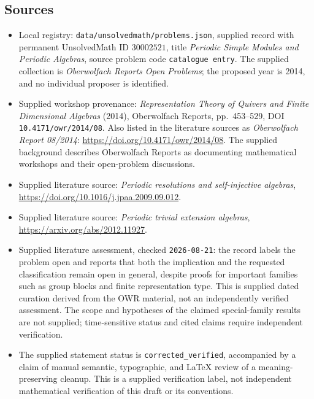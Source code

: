 \documentclass[11pt]{article}
\begin{document}
\subsection{Sources}
\begin{itemize}
\item Local registry: \texttt{data/unsolvedmath/problems.json}, supplied record with permanent UnsolvedMath ID \(30002521\), title \emph{Periodic Simple Modules and Periodic Algebras}, source problem code \texttt{catalogue entry}. The supplied collection is \emph{Oberwolfach Reports Open Problems}; the proposed year is 2014, and no individual proposer is identified.
\item Supplied workshop provenance: \emph{Representation Theory of Quivers and Finite Dimensional Algebras} (2014), Oberwolfach Reports, pp.\ 453--529, DOI \texttt{10.4171/owr/2014/08}. Also listed in the literature sources as \emph{Oberwolfach Report 08/2014}: \url{https://doi.org/10.4171/owr/2014/08}. The supplied background describes Oberwolfach Reports as documenting mathematical workshops and their open-problem discussions.
\item Supplied literature source: \emph{Periodic resolutions and self-injective algebras}, \url{https://doi.org/10.1016/j.jpaa.2009.09.012}.
\item Supplied literature source: \emph{Periodic trivial extension algebras}, \url{https://arxiv.org/abs/2012.11927}.
\item Supplied literature assessment, checked \texttt{2026-08-21}: the record labels the problem open and reports that both the implication and the requested classification remain open in general, despite proofs for important families such as group blocks and finite representation type. This is supplied dated curation derived from the OWR material, not an independently verified assessment. The scope and hypotheses of the claimed special-family results are not supplied; time-sensitive status and cited claims require independent verification.
\item The supplied statement status is \texttt{corrected\_verified}, accompanied by a claim of manual semantic, typographic, and LaTeX review of a meaning-preserving cleanup. This is a supplied verification label, not independent mathematical verification of this draft or its conventions.
\end{itemize}
\end{document}

